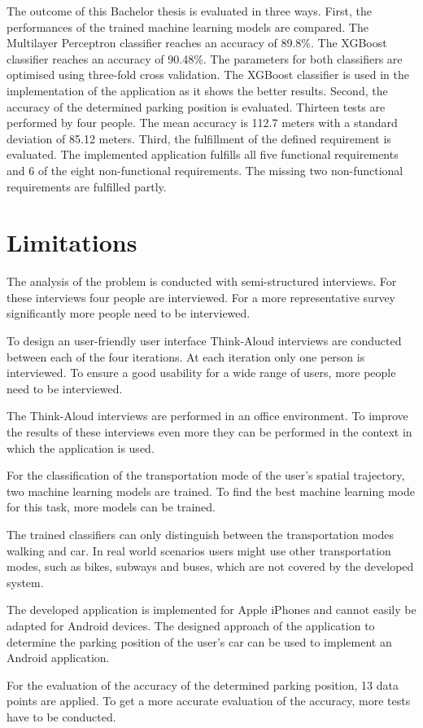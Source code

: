 The outcome of this Bachelor thesis is evaluated in three ways. First, the performances of the trained machine learning models are compared. The Multilayer Perceptron classifier reaches an accuracy of 89.8\%. The XGBoost classifier reaches an accuracy of 90.48\%. The parameters for both classifiers are optimised using three-fold cross validation. The XGBoost classifier is used in the implementation of the application as it shows the better results. Second, the accuracy of the determined parking position is evaluated. Thirteen tests are performed by four people. The mean accuracy is 112.7 meters with a standard deviation of 85.12 meters. Third, the fulfillment of the defined requirement is evaluated. The implemented application fulfills all five functional requirements and 6 of the eight non-functional requirements. The missing two non-functional requirements are fulfilled partly. 


\section{Limitations}
The analysis of the problem is conducted with semi-structured interviews. For these interviews four people are interviewed. For a more representative survey significantly more people need to be interviewed. 

To design an user-friendly user interface Think-Aloud interviews are conducted between each of the four iterations. At each iteration only one person is interviewed. To ensure a good usability for a wide range of users, more people need to be interviewed. 

The Think-Aloud interviews are performed in an office environment. To improve the results of these interviews even more they can be performed in the context in which the application is used. 

For the classification of the transportation mode of the user's spatial trajectory, two machine learning models are trained. To find the best machine learning mode for this task, more models can be trained.

The trained classifiers can only distinguish between the transportation modes walking and car. In real world scenarios users might use other transportation modes, such as bikes, subways and buses, which are not covered by the developed system. 

The developed application is implemented for Apple iPhones and cannot easily be adapted for Android devices. The designed approach of the application to determine the parking position of the user's car can be used to implement an Android application. 

For the evaluation of the accuracy of the determined parking position, 13 data points are applied. To get a more accurate evaluation of the accuracy, more tests have to be conducted. 


